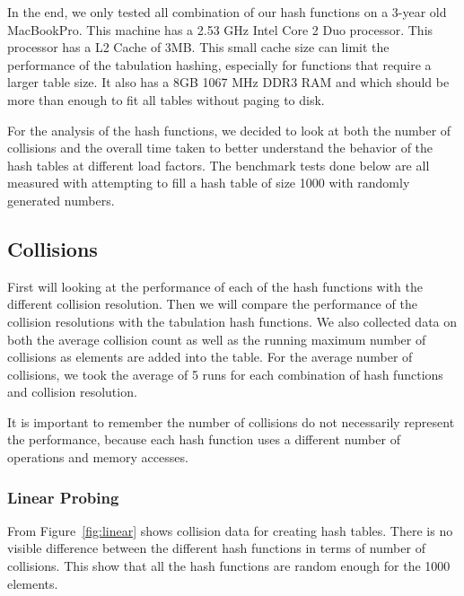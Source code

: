 \documentclass[11pt]{article}
\begin{document}
In the end, we only tested all combination of our hash functions on a 3-year old MacBookPro.
This machine has a  2.53 GHz Intel Core 2 Duo processor. This processor has a L2 Cache of 3MB.
This small cache size can limit the performance of the tabulation hashing, especially for functions
that require a larger table size.
It also has a 8GB 1067 MHz DDR3 RAM and which should be more than enough to fit all tables
without paging to disk.

For the analysis of the hash functions, we decided to look at both the number of collisions
 and the overall time taken to better understand the behavior of the hash tables at 
 different load factors. The benchmark tests done below are all measured with 
 attempting to fill a hash table of size 1000 with randomly generated numbers.

\subsection{Collisions}
First will looking at the performance of each of the hash functions with the 
different collision resolution. Then we will compare the performance of the
collision resolutions with the tabulation hash functions. We also collected data on 
both the average collision count  as well as the running maximum 
number of collisions as elements are added into the table. For the average number of collisions,
we took the average of 5 runs for each combination of hash functions and collision resolution.

It is important to remember the number of collisions do not necessarily 
represent the performance, because each hash function uses a different 
number of operations and memory accesses.

\subsubsection{Linear Probing}
From Figure~\ref{fig:linear} shows collision data for creating hash tables. 
There is no visible difference between the different hash functions in
terms of number of collisions. This show that all the hash functions are 
random enough for the 1000 elements. 
\end{document}

